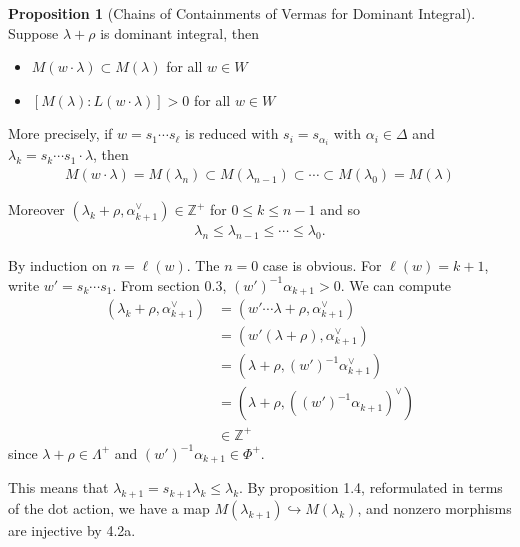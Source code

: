 \documentclass[11pt]{scrartcl}
\theoremstyle{definition}
\theoremstyle{theorem}
\newtheorem{proposition}[theorem]{Proposition}
\theoremstyle{proof}
\newenvironment{proof}
{\pushQED{$\qed$}\pf}
{\par\popQED\endpf}
\theoremstyle{definition}
\theoremstyle{break}
\theoremstyle{problem}
\providecommand{\tightlist}{%
  \setlength{\itemsep}{0pt}\setlength{\parskip}{0pt}}
\newcommand{\ZZ}[0]{{\mathbb{Z}}}
\newcommand{\dual}[0]{^\vee}
\newcommand{\injects}[0]{\hookrightarrow}
\newcommand{\inv}[0]{^{-1}}
\renewcommand{\qed}[0]{\hfill\blacksquare}
\begin{document}
\begin{proposition}[Chains of Containments of Vermas for Dominant Integral]

Suppose \(\lambda + \rho\) is dominant integral, then

\begin{itemize}
\tightlist
\item
  \(M(w\cdot \lambda) \subset M(\lambda)\) for all \(w\in W\)
\item
  \([M(\lambda): L(w\cdot \lambda)] > 0\) for all \(w\in W\)
\end{itemize}

More precisely, if \(w = s_1 \cdots s_\ell\) is reduced with
\(s_i = s_{\alpha_i}\) with \(\alpha_i \in \Delta\) and
\(\lambda_k = s_k \cdots s_1 \cdot \lambda\), then
\begin{align*}
M(w\cdot \lambda) = M(\lambda_n) \subset M(\lambda_{n-1}) \subset \cdots \subset M(\lambda_0) = M(\lambda)
\end{align*}

Moreover \((\lambda_k + \rho, \alpha_{k+1}\dual) \in \ZZ^+\) for
\(0\leq k \leq n-1\) and so
\begin{align*}
\lambda_n \leq \lambda_{n-1} \leq \cdots \leq \lambda_0
.\end{align*}\end{proposition}

\begin{proof}

By induction on \(n = \ell(w)\). The \(n=0\) case is obvious. For
\(\ell(w) = k+1\), write \(w'= s_k \cdots s_1\). From section 0.3,
\((w')\inv \alpha_{k+1} > 0\). We can compute \begin{align*}
  (\lambda_k + \rho, \alpha_{k+1}\dual)
  &= (w' \cdots \lambda + \rho, \alpha_{k+1}\dual) \\
  &= (w'(\lambda + \rho), \alpha_{k+1}\dual) \\
  &= (\lambda + \rho, (w')\inv \alpha_{k+1}\dual) \\
  &= (\lambda + \rho, ((w')\inv \alpha_{k+1})\dual) \\
  &\in \ZZ^{+}
  \end{align*} since \(\lambda + \rho \in \Lambda^+\) and
\((w')\inv \alpha_{k+1} \in \Phi^+\).\end{proof}

This means that \(\lambda_{k+1} = s_{k+1} \lambda_k \leq \lambda_k\). By
proposition 1.4, reformulated in terms of the dot action, we have a map
\(M(\lambda_{k+1}) \injects M(\lambda_k)\), and nonzero morphisms are
injective by 4.2a.
\end{document}
